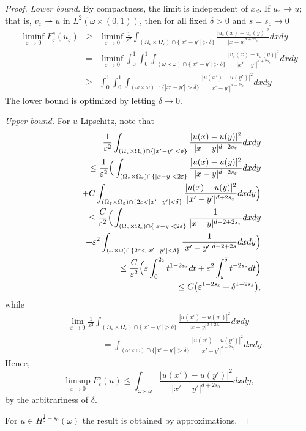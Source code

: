 \documentclass[11pt]{article}
\def\e{\varepsilon}
\newcommand{\weak}{\rightharpoonup}
\begin{document}
\begin{proof}
{\em Lower bound.} 
By compactness, the limit is independent of $x_d$.
If $u_\e\to u$; that is, $v_\e\weak u$ in $L^2(\omega\times(0,1))$, then for all fixed $\delta>0$ and $s=s_\e\to 0$
\begin{eqnarray*}\liminf_{\e\to 0}F_\e^s(u_\e)
&\ge& \liminf_{\e\to 0}\frac{1}{\e^2}\int_{(\Omega_\e\times \Omega_\e)\cap \{|x'-y'|>\delta\}}\frac{|u_\e(x)-u_\e(y)|^2}{|x-y|^{d+2s_\e}}dx dy
\\
&=&\liminf_{\e\to 0}\int_0^1\int_0^1\int_{(\omega\times\omega)\cap \{|x'-y'|>\delta\}}\frac{|v_\e(x)-v_\e(y)|^2}{|x'-y'|^{d+2s_\e}}dx dy
\\
&\ge&\int_0^1\int_0^1\int_{(\omega\times\omega)\cap \{|x'-y'|>\delta\}}\frac{|u(x')-u(y')|^2}{|x'-y'|^{d+2s_0}}dx dy
\end{eqnarray*}
The lower bound is optimized by letting $\delta\to0$.

\bigskip
{\em Upper bound.} For $u$ Lipschitz, note that
\begin{eqnarray*}
&&\hskip-1cm\frac{1}{\e^2}\int_{(\Omega_\e\times \Omega_\e)\cap \{|x'-y'|<\delta\}}\frac{|u(x)-u(y)|^2}{|x-y|^{d+2s_\e}}dx dy
\\
&&\le \frac{1}{\e^2}\Big(\int_{(\Omega_\e\times \Omega_\e)\cap \{|x-y|< 2\e\}}\frac{|u(x)-u(y)|^2}{|x-y|^{d+2s_\e}}dx dy
\\&&\qquad +
C\int_{(\Omega_\e\times \Omega_\e)\cap \{2\e<|x'-y'|<\delta\}}\frac{|u(x)-u(y)|^{2}}{|x'-y'|^{d+2s_\e}}dx dy\Big)
\\
&&\le \frac{C}{\e^2}\Big(\int_{(\Omega_\e\times \Omega_\e)\cap \{|x-y|< 2\e\}}\frac{1}{|x-y|^{d-2+2s_\e}}dx dy
\\&&\qquad +
\e^2\int_{(\omega\times\omega)\cap \{2\e<|x'-y'|<\delta\}}\frac{1}{|x'-y'|^{d-2+2s}}dx dy\Big)
\\
&&\le \frac{C}{\e^2}\Big(\e\int_0^{2\e}t^{1-2s_\e}dt
+
\e^2\int_{\e}^{\delta}t^{-2s_\e}dt\Big)
\\
&&\le C\big(\e^{1-2s_\e}
+
\delta^{1-2s_\e}\big),
\end{eqnarray*}
while
\begin{eqnarray*}
&&\lim_{\e\to 0}\frac{1}{\e^2}\int_{(\Omega_\e\times \Omega_\e)\cap \{|x'-y'|>\delta\}}\frac{|u(x')-u(y')|^2}{|x-y|^{d+2s_\e}}dx dy
\\ &&\qquad\qquad
=\int_{(\omega\times\omega)\cap \{|x'-y'|>\delta\}}\frac{|u(x')-u(y')|^2}{|x'-y'|^{d+2s_0}}dx dy.
\end{eqnarray*}
Hence, 
$$\limsup_{\e\to 0}F_\e^s(u)
\le\int_{\omega\times\omega}\frac{|u(x')-u(y')|^2}{|x'-y'|^{d+2s_0}}dx dy,
$$
by the arbitrariness of $\delta$.

For $u\in H^{\frac12+s_0}(\omega)$ the result is obtained by approximations.
\end{proof}
\end{document}
